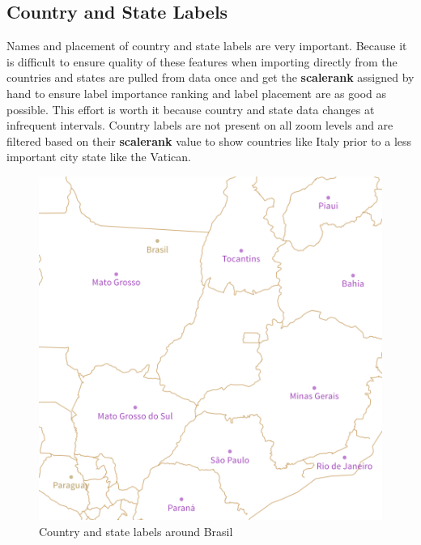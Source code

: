 \subsection{Country and State Labels}

\noindent\begin{minipage}[t]{0.48\linewidth}
    \vspace{0pt}
    Names and placement of country and state labels are very important.
    Because it is difficult to ensure quality of these features when importing directly from \osm{} the countries and states are pulled from \osm{} data once
    and get the \textbf{scalerank} assigned by hand to ensure label
    importance ranking and label placement are as good as possible.
    This effort is worth it because country and state data changes
    at infrequent intervals.
    Country labels are not present on all zoom levels and are filtered based
    on their \textbf{scalerank} value to show countries like Italy prior to a less important city state like the Vatican.
\end{minipage}
\hfill
\begin{minipage}[t]{0.48\linewidth}
    \vspace{0pt}
    \begin{figure}[H]
        \includegraphics[width=\textwidth]{images/schema/country_state_label_example}
        \caption{Country and state labels around Brasil}
    \end{figure}
\end{minipage}

